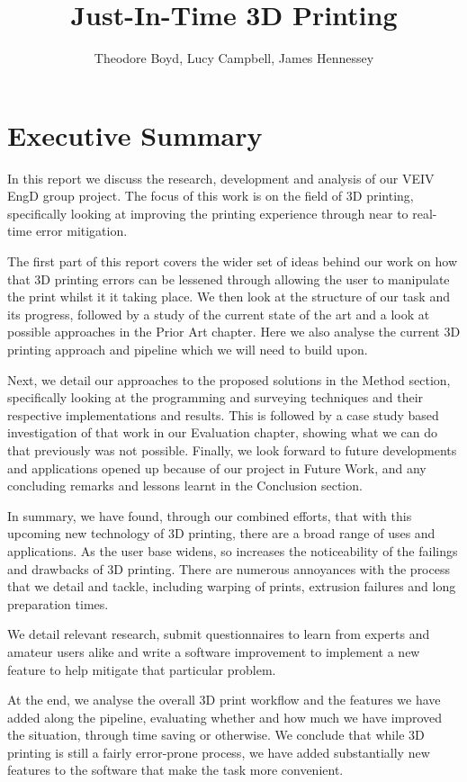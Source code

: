 \documentclass[11pt]{report} %
\title{Just-In-Time 3D Printing}
\author{Theodore Boyd, Lucy Campbell, James Hennessey}
\date{} %
\begin{document}
\maketitle

\chapter{Executive Summary}
In this report we discuss the research, development and analysis of our VEIV EngD group project. The focus of this work is on the field of 3D printing, specifically looking at improving the printing experience through near to real-time error mitigation.

The first part of this report covers the wider set of ideas behind our work on how that 3D printing errors can be lessened through allowing the user to manipulate the print whilst it it taking place. We then look at the structure of our task and its progress, followed by a study of the current state of the art and a look at possible approaches in the Prior Art chapter. Here we also analyse the current 3D printing approach and pipeline which we will need to build upon.

Next, we detail our approaches to the proposed solutions in the Method section, specifically looking at the programming and surveying techniques and their respective implementations and results. This is followed by a case study based investigation of that work in our Evaluation chapter, showing what we can do that previously was not possible.
Finally, we look forward to future developments and applications opened up because of our project in Future Work, and any concluding remarks and lessons learnt in the Conclusion section.

In summary, we have found, through our combined efforts, that with this upcoming new technology of 3D printing, there are a broad range of uses and applications. As the user base widens, so increases the noticeability of the failings and drawbacks of 3D printing. There are numerous annoyances with the process that we detail and tackle, including warping of prints, extrusion failures and long preparation times.

We detail relevant research, submit questionnaires to learn from experts and amateur users alike and write a software improvement to implement a new feature to help mitigate that particular problem.

At the end, we analyse the overall 3D print workflow and the features we have added along the pipeline, evaluating whether and how much we have improved the situation, through time saving or otherwise. We conclude that while 3D printing is still a fairly error-prone process, we have added substantially new features to the software that make the task more convenient.
\end{document}
